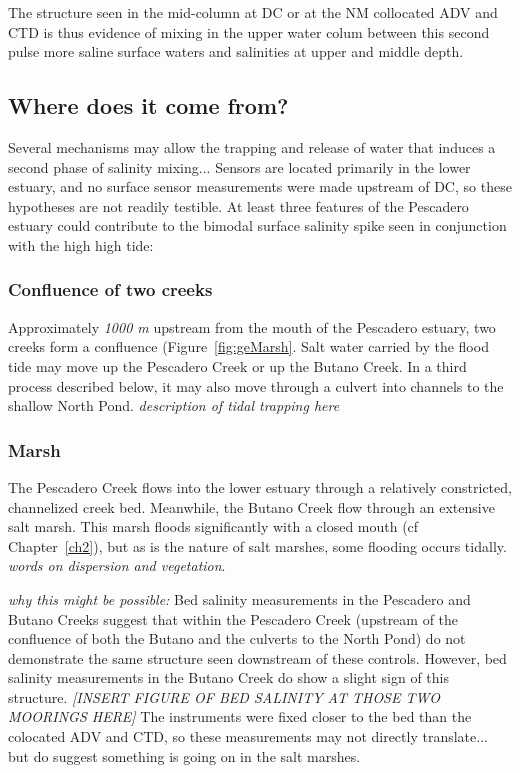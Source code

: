 The structure seen in the mid-column at DC or at the NM collocated ADV and CTD is thus evidence of mixing in the upper water colum between this second pulse more saline surface waters and salinities at upper and middle depth. 

\subsection{Where does it come from?}

Several mechanisms may allow the trapping and release of water that induces a second phase of salinity mixing... Sensors are located primarily in the lower estuary, and no surface sensor measurements were made upstream of DC, so these hypotheses are not readily testible. At least three features of the Pescadero estuary could contribute to the bimodal surface salinity spike seen in conjunction with the high high tide:

\subsubsection{Confluence of two creeks}
Approximately \emph{1000 m} upstream from the mouth of the Pescadero estuary, two creeks form a confluence (Figure~\ref{fig:geMarsh}. Salt water carried by the flood tide may move up the Pescadero Creek or up the Butano Creek. In a third process described below, it may also move through a culvert into channels to the shallow North Pond. \emph{description of tidal trapping here}

\subsubsection{Marsh}
The Pescadero Creek flows into the lower estuary through a relatively constricted, channelized creek bed.  Meanwhile, the Butano Creek flow through an extensive salt marsh. This marsh floods significantly with a closed mouth (cf Chapter~\ref{ch2}), but as is the nature of salt marshes, some flooding occurs tidally. \emph{words on dispersion and vegetation}. 

\emph{why this might be possible:}  Bed salinity measurements in the Pescadero and Butano Creeks suggest that within the Pescadero Creek (upstream of the confluence of both the Butano and the culverts to the North Pond) do not demonstrate the same structure seen downstream of these controls. However, bed salinity measurements in the Butano Creek do show a slight sign of this structure. \emph{[INSERT FIGURE OF BED SALINITY AT THOSE TWO MOORINGS HERE]} The instruments were fixed closer to the bed than the colocated ADV and CTD, so these measurements may not directly translate... but do suggest something is going on in the salt marshes.  

